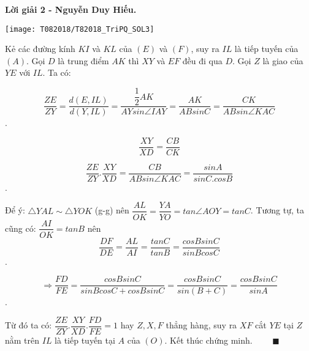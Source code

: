 \textbf{Lời giải 2 - Nguyễn Duy Hiếu.}

\begin{center}
	\texttt{[image: T082018/T82018\_TriPQ\_SOL3]}
	
\end{center}

Kẻ các đường kính $KI$ và $KL$ của $(E)$ và $(F)$, suy ra $IL$ là tiếp tuyến của $(A)$. Gọi $D$ là trung điểm $AK$ thì $XY$ và $EF$ đều đi qua $D$. Gọi $Z$ là giao của $YE$ với $IL$. Ta có:

$$ \dfrac{ZE}{ZY} = \dfrac{d(E,IL)}{d(Y,IL)} = \dfrac{\dfrac{1}{2}AK}{AY sin{\angle IAY}} = \dfrac{AK}{AB sinC} = \dfrac{CK}{AB sin{\angle KAC}}$$.

$$ \dfrac{XY}{XD} = \dfrac{CB}{CK}$$

$$ \dfrac{ZE}{ZY}.\dfrac{XY}{XD} = \dfrac{CB}{AB sin{\angle KAC}} = \dfrac{sinA}{sinC.cosB}$$.

Để ý: $\triangle YAL \sim \triangle YOK$ (g-g) nên $\dfrac{AL}{OK} = \dfrac{YA}{YO} = tan{\angle AOY} = tan C$. Tương tự, ta cũng có: $\dfrac{AI}{OK} = tanB$ nên $$ \dfrac{DF}{DE} = \dfrac{AL}{AI} = \dfrac{tanC}{tanB} = \dfrac{cosBsinC}{sinBcosC}$$.

$$ \Longrightarrow \frac{FD}{FE} = \dfrac{cosBsinC}{sinBcosC+cosBsinC} = \dfrac{cosBsinC}{sin(B+C)} = \dfrac{cosBsinC}{sinA}$$.

Từ đó ta có: $\dfrac{ZE}{ZY}.\dfrac{XY}{XD}.\dfrac{FD}{FE} = 1$ hay $Z, X, F$ thẳng hàng, suy ra $XF$ cắt $YE$ tại $Z$ nằm trên $IL$ là tiếp tuyến tại $A$ của $(O)$. Kết thúc chứng minh. $\qquad \blacksquare$